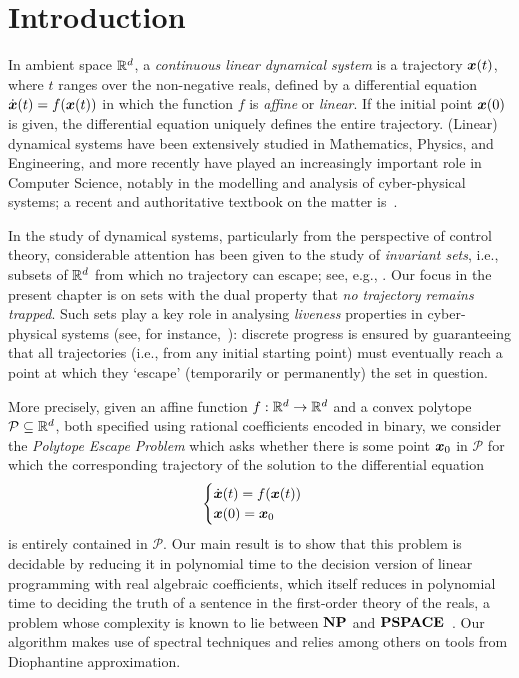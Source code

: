 \section{Introduction}

In ambient space $\mathbb{R}^{d}$, a \emph{continuous linear
  dynamical system} is a trajectory $\boldsymbol{x}(t)$, where $t$
ranges over the non-negative reals, defined by a differential equation
$\dot{\boldsymbol{x}}(t)=f(\boldsymbol{x}(t))$ in which the function
$f$ is \emph{affine} or \emph{linear}. If the initial point
$\boldsymbol{x}(0)$ is given, the differential equation uniquely
defines the entire trajectory. (Linear) dynamical systems have been
extensively studied in Mathematics, Physics, and Engineering, and more
recently have played an increasingly important role in Computer
Science, notably in the modelling and analysis of cyber-physical
systems; a recent and authoritative textbook on the matter
is~\cite{Alu15}.

In the study of dynamical systems, particularly from the perspective
of control theory, considerable attention has been given to the study
of \emph{invariant sets}, i.e., subsets of $\mathbb{R}^{d}$ from which
no trajectory can escape; see, e.g.,
\cite{CastelanH92,BlondelT00,BM07,SDI08}. Our focus in the present
chapter is on sets with the dual property that \emph{no trajectory
  remains trapped}. Such sets play a key role in analysing
\emph{liveness} properties in cyber-physical systems (see, for
instance,~\cite{Alu15}): discrete progress is ensured by
guaranteeing that all trajectories (i.e., from any initial starting
point) must eventually reach a point at which they `escape'
(temporarily or permanently) the set in question.

More precisely, given an affine function
$f:\mathbb{R}^{d}\rightarrow \mathbb{R}^{d}$ and a convex polytope
$\mathcal{P}\subseteq\mathbb{R}^{d}$, both specified using rational
coefficients encoded in binary, we consider the \emph{Polytope
  Escape Problem} which asks whether there is some point
$\boldsymbol{x}_0$ in $\mathcal{P}$ for which the corresponding
trajectory of the solution to the differential equation
\begin{equation*}
\begin{displaystyle} \begin{cases}
\dot{\myvector{x}}(t)=f(\myvector{x}(t)) \\
\myvector{x}(0)=\myvector{x}_{0}
\end{cases} \end{displaystyle}
\end{equation*}
is entirely contained in $\mathcal{P}$. Our main result is to show
that this problem is decidable by reducing it in polynomial time to
the decision version of linear programming with real algebraic
coefficients, which itself reduces in polynomial time to deciding the
truth of a sentence in the first-order theory of the reals, a problem
whose complexity is known to lie between $\textbf{NP}$ and
$\textbf{PSPACE}$~\cite{Canny88}. Our algorithm makes use of spectral
techniques and relies among others on tools from Diophantine
approximation.

